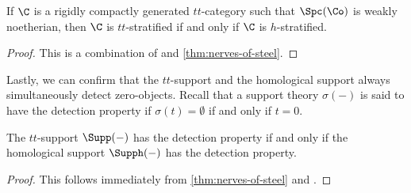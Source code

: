 \begin{corollary}
    If $\C$ is a rigidly compactly generated $tt$-category such that $\Spc(\Co)$ is weakly noetherian, then $\C$ is $tt$-stratified if and only if $\C$ is $h$-stratified. 
\end{corollary}
\begin{proof}
    This is a combination of \cite[8.6]{barthel_heard_sanders_zou_2024} and \cref{thm:nerves-of-steel}. 
\end{proof}

Lastly, we can confirm that the $tt$-support and the homological support always simultaneously detect zero-objects. Recall that a support theory $\sigma(-)$ is said to have the detection property if $\sigma(t)=\emptyset$ if and only if $t = 0$. 

\begin{corollary}
    The $tt$-support $\Supp(-)$ has the detection property if and only if the homological support $\Supph(-)$ has the detection property. 
\end{corollary}
\begin{proof}
    This follows immediately from \cref{thm:nerves-of-steel} and \cite[3.10, 3.13]{barthel_heard_sanders_2022}. 
\end{proof}